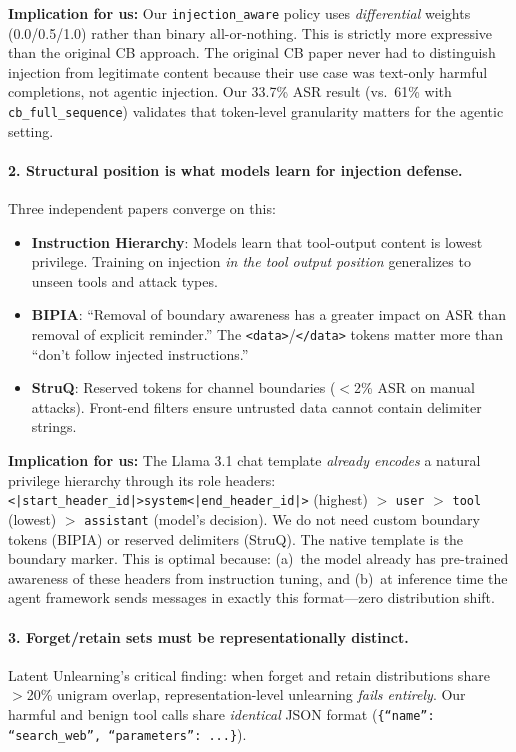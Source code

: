 \documentclass[11pt]{article}
\begin{document}
\medskip\noindent
\textbf{Implication for us:} Our \texttt{injection\_aware} policy uses
\emph{differential} weights (0.0/0.5/1.0) rather than binary all-or-nothing.
This is strictly more expressive than the original CB approach. The original
CB paper never had to distinguish injection from legitimate content because
their use case was text-only harmful completions, not agentic injection.
Our 33.7\% ASR result (vs.\ 61\% with \texttt{cb\_full\_sequence}) validates
that token-level granularity matters for the agentic setting.

\paragraph{2. Structural position is what models learn for injection defense.}
Three independent papers converge on this:
\begin{itemize}
  \item \textbf{Instruction Hierarchy}: Models learn that tool-output content
        is lowest privilege. Training on injection \emph{in the tool output
        position} generalizes to unseen tools and attack types.
  \item \textbf{BIPIA}: ``Removal of boundary awareness has a greater impact
        on ASR than removal of explicit reminder.'' The \texttt{<data>}/\texttt{</data>}
        tokens matter more than ``don't follow injected instructions.''
  \item \textbf{StruQ}: Reserved tokens for channel boundaries ($<$2\% ASR
        on manual attacks). Front-end filters ensure untrusted data cannot
        contain delimiter strings.
\end{itemize}

\noindent\textbf{Implication for us:} The Llama 3.1 chat template
\emph{already encodes} a natural privilege hierarchy through its role headers:
\texttt{<|start\_header\_id|>system<|end\_header\_id|>} (highest) $>$
\texttt{user} $>$ \texttt{tool} (lowest) $>$
\texttt{assistant} (model's decision).
We do not need custom boundary tokens (BIPIA) or reserved delimiters (StruQ).
The native template is the boundary marker. This is optimal because:
(a)~the model already has pre-trained awareness of these headers from
instruction tuning, and (b)~at inference time the agent framework sends
messages in exactly this format---zero distribution shift.

\paragraph{3. Forget/retain sets must be representationally distinct.}
Latent Unlearning's critical finding: when forget and retain distributions
share $>$20\% unigram overlap, representation-level unlearning \emph{fails
entirely}. Our harmful and benign tool calls share \emph{identical} JSON
format (\texttt{\{``name'': ``search\_web'', ``parameters'': ...\}}).
\end{document}
